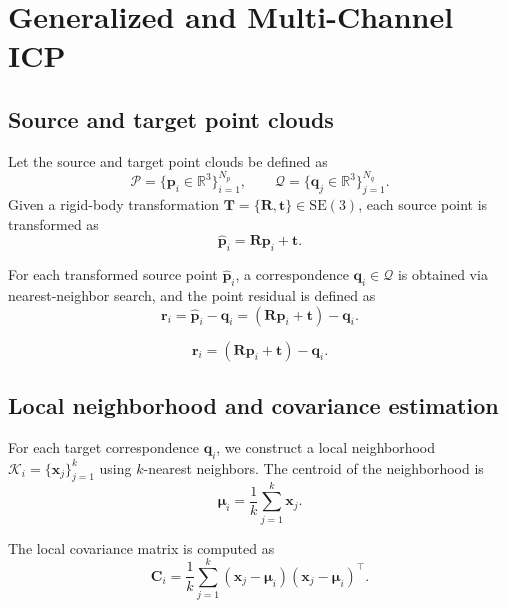 \newpage
\section{Generalized and Multi-Channel ICP}

\subsection{Source and target point clouds}
Let the source and target point clouds be defined as
\begin{equation}
\mathcal{P} = \{ \mathbf{p}_i \in \mathbb{R}^3 \}_{i=1}^{N_p},
\qquad
\mathcal{Q} = \{ \mathbf{q}_j \in \mathbb{R}^3 \}_{j=1}^{N_q}.
\end{equation}
Given a rigid-body transformation
\(\mathbf{T} = \{\mathbf{R}, \mathbf{t}\} \in \mathrm{SE}(3)\),
each source point is transformed as
\begin{equation}
\hat{\mathbf{p}}_i = \mathbf{R}\mathbf{p}_i + \mathbf{t}.
\end{equation}

For each transformed source point \(\hat{\mathbf{p}}_i\), a correspondence
\(\mathbf{q}_i \in \mathcal{Q}\) is obtained via nearest-neighbor search, and the
point residual is defined as
\begin{equation}
\mathbf{r}_i = \hat{\mathbf{p}}_i - \mathbf{q}_i = (\mathbf{R}\mathbf{p}_i + \mathbf{t}) - \mathbf{q}_i.
\end{equation}

\begin{equation}
\mathbf{r}_i =  (\mathbf{R}\mathbf{p}_i + \mathbf{t}) - \mathbf{q}_i.
\end{equation}


\subsection{Local neighborhood and covariance estimation}
For each target correspondence \(\mathbf{q}_i\), we construct a local neighborhood
\(\mathcal{K}_i = \{\mathbf{x}_j\}_{j=1}^{k}\) using \(k\)-nearest neighbors.
The centroid of the neighborhood is
\begin{equation}
\bm{\mu}_i = \frac{1}{k} \sum_{j=1}^{k} \mathbf{x}_j .
\end{equation}

The local covariance matrix is computed as
\begin{equation}
\mathbf{C}_i
=
\frac{1}{k}
\sum_{j=1}^{k}
(\mathbf{x}_j - \bm{\mu}_i)
(\mathbf{x}_j - \bm{\mu}_i)^\top .
\end{equation}



